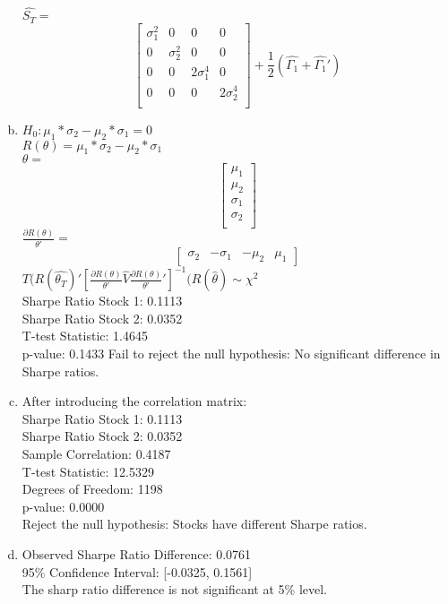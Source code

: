 \begin{enumerate}[(a)]
$\hat{S_T} = $
\[
\begin{bmatrix}
  \sigma_1^2 & 0 & 0 &0 \\
  0 & \sigma_2^2 &0 &0 \\
  0 & 0 & 2\sigma_1^4 & 0 \\
  0 & 0 & 0 & 2\sigma_2^4 \\
\end{bmatrix}
+\frac{1}{2}(\hat{\Gamma_1}+\hat{\Gamma_1}')
\]

\item 
$H_0: \mu_1*\sigma_2 - \mu_2*\sigma_1 = 0 $\\
$R (\theta) = \mu_1*\sigma_2 - \mu_2*\sigma_1$\\
$\theta = $
\[
\begin{bmatrix}
  \mu_1 \\
  \mu_2 \\
  \sigma_1\\
  \sigma_2 \\
\end{bmatrix}
\]
$\frac{\partial R(\theta)}{\theta '}=$
\[
\begin{bmatrix}
  \sigma_2 & -\sigma_1 & -\mu_2 & \mu_1
\end{bmatrix}
\]
$T(R(\hat{\theta_T})'[\frac{\partial R(\theta)}{\theta '}\hat{V}\frac{\partial R(\theta)}{\theta '}']^{-1}(R(\hat{\theta}) \sim \chi^2$\\
Sharpe Ratio Stock 1: 0.1113\\
Sharpe Ratio Stock 2: 0.0352\\
T-test Statistic: 1.4645\\
p-value: 0.1433
Fail to reject the null hypothesis: No significant difference in Sharpe ratios.
\item 
After  introducing the correlation matrix: \\
Sharpe Ratio Stock 1: 0.1113\\
Sharpe Ratio Stock 2: 0.0352\\
Sample Correlation: 0.4187\\
T-test Statistic: 12.5329\\
Degrees of Freedom: 1198\\
p-value: 0.0000\\
Reject the null hypothesis: Stocks have different Sharpe ratios.
\item 
Observed Sharpe Ratio Difference: 0.0761\\
95\% Confidence Interval: [-0.0325, 0.1561]\\
The sharp ratio difference is not significant at 5\% level.

\end{enumerate}

